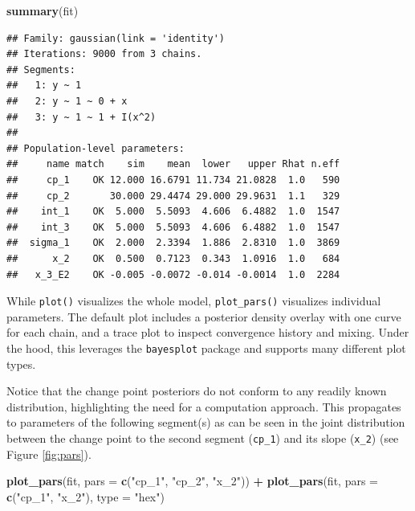 \documentclass[
  american,
]{article}
\newenvironment{Shaded}{\begin{snugshade}}{\end{snugshade}}
\newcommand{\DataTypeTok}[1]{\textcolor[rgb]{0.13,0.29,0.53}{#1}}
\newcommand{\KeywordTok}[1]{\textcolor[rgb]{0.13,0.29,0.53}{\textbf{#1}}}
\newcommand{\NormalTok}[1]{#1}
\newcommand{\OperatorTok}[1]{\textcolor[rgb]{0.81,0.36,0.00}{\textbf{#1}}}
\newcommand{\StringTok}[1]{\textcolor[rgb]{0.31,0.60,0.02}{#1}}
\begin{document}
\begin{Shaded}
\begin{Highlighting}[]
\KeywordTok{summary}\NormalTok{(fit)}
\end{Highlighting}
\end{Shaded}

\begin{verbatim}
## Family: gaussian(link = 'identity')
## Iterations: 9000 from 3 chains.
## Segments:
##   1: y ~ 1
##   2: y ~ 1 ~ 0 + x
##   3: y ~ 1 ~ 1 + I(x^2)
## 
## Population-level parameters:
##     name match    sim    mean  lower   upper Rhat n.eff
##     cp_1    OK 12.000 16.6791 11.734 21.0828  1.0   590
##     cp_2       30.000 29.4474 29.000 29.9631  1.1   329
##    int_1    OK  5.000  5.5093  4.606  6.4882  1.0  1547
##    int_3    OK  5.000  5.5093  4.606  6.4882  1.0  1547
##  sigma_1    OK  2.000  2.3394  1.886  2.8310  1.0  3869
##      x_2    OK  0.500  0.7123  0.343  1.0916  1.0   684
##   x_3_E2    OK -0.005 -0.0072 -0.014 -0.0014  1.0  2284
\end{verbatim}

While \texttt{plot()} visualizes the whole model, \texttt{plot\_pars()} visualizes individual parameters. The default plot includes a posterior density overlay with one curve for each chain, and a trace plot to inspect convergence history and mixing. Under the hood, this leverages the \texttt{bayesplot} package \citep{gabry2019} and supports many different plot types.

Notice that the change point posteriors do not conform to any readily known distribution, highlighting the need for a computation approach. This propagates to parameters of the following segment(s) as can be seen in the joint distribution between the change point to the second segment (\texttt{cp\_1}) and its slope (\texttt{x\_2}) (see Figure \ref{fig:pars}).

\begin{Shaded}
\begin{Highlighting}[]
\KeywordTok{plot_pars}\NormalTok{(fit, }\DataTypeTok{pars =} \KeywordTok{c}\NormalTok{(}\StringTok{"cp_1"}\NormalTok{, }\StringTok{"cp_2"}\NormalTok{, }\StringTok{"x_2"}\NormalTok{)) }\OperatorTok{+}\StringTok{ }
\StringTok{  }\KeywordTok{plot_pars}\NormalTok{(fit, }\DataTypeTok{pars =} \KeywordTok{c}\NormalTok{(}\StringTok{"cp_1"}\NormalTok{, }\StringTok{"x_2"}\NormalTok{), }\DataTypeTok{type =} \StringTok{"hex"}\NormalTok{)}
\end{Highlighting}
\end{Shaded}
\end{document}
